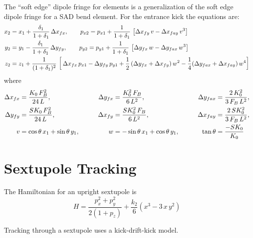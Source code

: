 The ``soft edge'' dipole fringe for  elements is a generalization of the soft edge
dipole fringe for a SAD bend element. For the entrance kick the equations are:
\begin{align}
  x_2 &= x_1 + \frac{\delta_1}{1 + \delta_1} \, \Delta x_{fx}, \qquad
  p_{x2} = p_{x1} + \frac{1}{1 + \delta_1} \, \left[ 
    \Delta x_{fy} \, v - \Delta x_{fay} \, v^3 \right] \nonumber \\
  y_2 &= y_1 - \frac{\delta_1}{1 + \delta_1} \, \Delta y_{fy}, \qquad
  p_{y2} = p_{y1} + \frac{1}{1 + \delta_1} \, \left[ 
    \Delta y_{fx} \, w - \Delta y_{fax} \, w^3 \right] \\
  z_2 &= z_1 + \frac{1}{(1 + \delta_1)^2} \, \left[ \, 
    \Delta x_{fx} \, p_{x1} - \Delta y_{fy} \, p_{y1} + 
    \frac{1}{2} \, (\Delta y_{fx} + \Delta x_{fy}) \, w^2 -
    \frac{1}{4} (\Delta y_{fax} + \Delta x_{fay}) \, w^4
    \right] \nonumber
\end{align}
where
\begin{alignat}{3}
  \Delta x_{fx}  &= \frac{K_0 \, F_B^2}{24 \, L}, & \qquad 
  \Delta y_{fx}  &= \frac{K_0^2 \, F_B}{6 \, L^2}, & \qquad 
  \Delta y_{fax} &= \frac{2 \, K_0^2}{3 \, F_B \, L^2}, \nonumber \\ 
  \Delta y_{fy}  &= \frac{SK_0 \, F_B^2}{24 \, L}, & \qquad
  \Delta x_{fy}  &= \frac{SK_0^2 \, F_B}{6 \, L^2}, & \qquad
  \Delta x_{fay} &= \frac{2 \, SK_0^2}{3 \, F_B \, L^2}, \\
  v &= \cos\theta \, x_1 + \sin\theta \, y_1, & \qquad
  w &= -\sin\theta \, x_1 + \cos\theta \, y_1, & \qquad
  \tan\theta &= \frac{-SK_0}{K_0} \nonumber
\end{alignat}


\section{Sextupole Tracking}
\label{s:sextupole.std}

The Hamiltonian for an upright sextupole is
\begin{equation}
  H = \frac{p_x^2 + p_y^2}{2 (1 + p_z)} + \frac{k_2}{6} (x^3 - 3 \, x \, y^2)
\end{equation}

Tracking through a sextupole uses a kick-drift-kick model.

